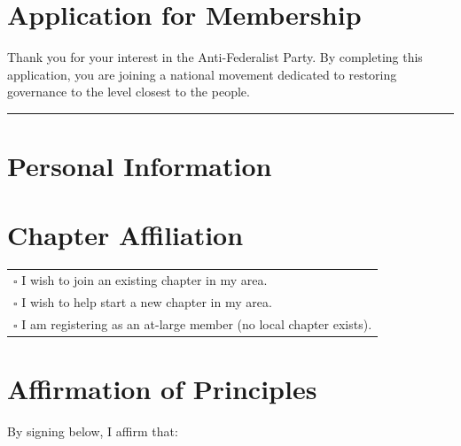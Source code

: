 \documentclass[11pt, letterpaper]{article}
\begin{document}

\section*{Application for Membership}

Thank you for your interest in the Anti-Federalist Party. By completing this application, you are joining a national movement dedicated to restoring governance to the level closest to the people.

\vspace{1em}
{\color{afp-teal}\rule{\textwidth}{0.5pt}}
\vspace{1em}

\section{Personal Information}


\section{Chapter Affiliation}


\vspace{0.5em}
\noindent
\begin{tabular}{@{}l@{}}
$\square$ \quad I wish to join an existing chapter in my area. \\[0.5em]
$\square$ \quad I wish to help start a new chapter in my area. \\[0.5em]
$\square$ \quad I am registering as an at-large member (no local chapter exists). \\
\end{tabular}

\section{Affirmation of Principles}

By signing below, I affirm that:
\end{document}
